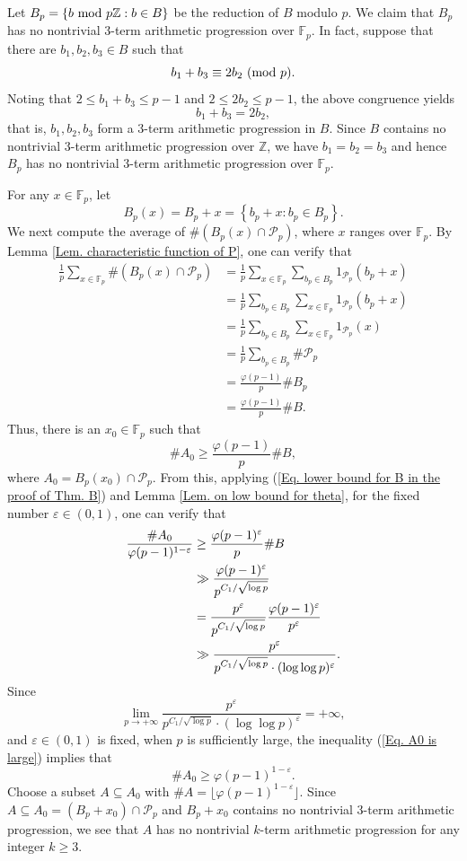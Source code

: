 \documentclass[12pt]{amsart}
\def\pmod #1{\ ({\rm{mod}}\ #1)}
\def\mod #1{\ {\rm mod}\ #1}
\theoremstyle{plain}
\theoremstyle{remark}
\begin{document}
	Let $B_p=\{b\mod{p\mathbb{Z}}: b\in B\}$ be the reduction of $B$ modulo $p$. We claim that $B_p$ has no nontrivial $3$-term arithmetic progression over $\mathbb{F}_p$. In fact, suppose that there are $b_1,b_2,b_3\in B$ such that 
    $$b_1+b_3\equiv 2b_2\pmod{p}.$$
	Noting that $2\le b_1+b_3\le p-1$ and $2\le 2b_2\le p-1$, the above congruence yields 
	$$b_1+b_3=2b_2,$$
	that is, $b_1,b_2,b_3$ form a $3$-term arithmetic progression in $B$. Since $B$ contains no nontrivial $3$-term arithmetic progression over $\mathbb{Z}$, we have $b_1=b_2=b_3$ and hence $B_p$ has no nontrivial $3$-term arithmetic progression over $\mathbb{F}_p$. 
	
	For any $x\in\mathbb{F}_p$, let 
	$$B_p(x)=B_p+x=\left\{b_p+x: b_p\in B_p\right\}.$$
	We next compute the average of $\#(B_p(x)\cap\mathcal{P}_p)$, where $x$ ranges over $\mathbb{F}_p$. By Lemma \ref{Lem. characteristic function of P}, one can verify that 
	\begin{align*}
		\frac{1}{p}\sum_{x\in\mathbb{F}_p}\#(B_p(x)\cap\mathcal{P}_p)
&=\frac{1}{p}\sum_{x\in\mathbb{F}_p}\sum_{b_p\in B_p}1_{\mathcal{P}_p}(b_p+x)\\
&=\frac{1}{p}\sum_{b_p\in B_p}\sum_{x\in\mathbb{F}_p}1_{\mathcal{P}_p}(b_p+x)\\
&=\frac{1}{p}\sum_{b_p\in B_p}\sum_{x\in\mathbb{F}_p}1_{\mathcal{P}_p}(x)\\
&=\frac{1}{p}\sum_{b_p\in B_p}\#\mathcal{P}_p\\
&=\frac{\varphi(p-1)}{p}\#B_p\\
&=\frac{\varphi(p-1)}{p}\#B.
	\end{align*}
	Thus, there is an $x_0\in\mathbb{F}_p$ such that 
	$$\#A_0\ge \frac{\varphi(p-1)}{p}\#B,$$
	where $A_0=B_p(x_0)\cap\mathcal{P}_p$. From this, applying (\ref{Eq. lower bound for B in the proof of Thm. B}) and Lemma \ref{Lem. on low bound for theta}, for the fixed number $\varepsilon\in(0,1)$, one can verify that 
	\begin{align}\label{Eq. A0 is large}
		  \frac{\#A_0}{\varphi(p-1)^{1-\varepsilon}}
&\ge \frac{\varphi(p-1)^{\varepsilon}}{p}\#B\notag\\
&\gg \frac{\varphi(p-1)^{\varepsilon}}{p^{C_1/\sqrt{\log p}}}\notag\\
&=\frac{p^{\varepsilon}}{p^{C_1/\sqrt{\log p}}}\frac{\varphi(p-1)^{\varepsilon}}{p^{\varepsilon}}\notag\\
&\gg \frac{p^{\varepsilon}}{p^{C_1/\sqrt{\log p}}\cdot (\log\log p)^{\varepsilon}}.
	\end{align}
	Since 
	$$\lim_{p\rightarrow+\infty}\frac{p^{\varepsilon}}{p^{C_1/\sqrt{\log p}}\cdot (\log\log p)^{\varepsilon}}=+\infty,$$
	and $\varepsilon\in(0,1)$ is fixed, when $p$ is sufficiently large, the inequality (\ref{Eq. A0 is large}) implies that 
	$$\#A_0\ge \varphi(p-1)^{1-\varepsilon}.$$
	Choose a subset $A\subseteq A_0$ with $\#A=\lfloor\varphi(p-1)^{1-\varepsilon}\rfloor$. Since $A\subseteq A_0=(B_p+x_0)\cap\mathcal{P}_p$ and $B_p+x_0$ contains no nontrivial $3$-term arithmetic progression, we see that $A$ has no nontrivial $k$-term arithmetic progression for any integer $k\ge3$. 
	
\end{document}
